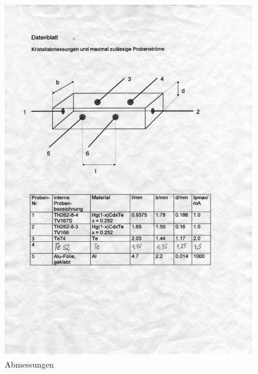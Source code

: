 \begin{figure}[htb!]
 \centering
 \includegraphics[viewport=40 420 470 700,clip]{../docs/scan_datenblatt}
 \caption{Abmessungen}
 \label{fig:abmessungen}
\end{figure}


